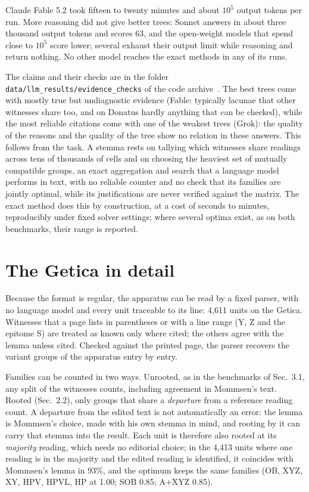 \documentclass[11pt,a4paper]{article}
\theoremstyle{remark}
\begin{document}
Claude Fable 5.2 took fifteen to twenty minutes and about $10^5$ output tokens per run. More reasoning did not give better trees: Sonnet answers in about three thousand output tokens and scores 63, and the open-weight models that spend close to $10^5$ score lower; several exhaust their output limit while reasoning and return nothing. No other model reaches the exact methods in any of its runs.

The claims and their checks are in the folder \texttt{data/llm\_results/evidence\_checks} of the code archive~\citep{StemmaMWIS}. The best trees come with mostly true but undiagnostic evidence (Fable: typically lacunae that other witnesses share too, and on Donatus hardly anything that can be checked), while the most reliable citations come with one of the weakest trees (Grok): the quality of the reasons and the quality of the tree show no relation in these answers. This follows from the task. A stemma rests on tallying which witnesses share readings across tens of thousands of cells and on choosing the heaviest set of mutually compatible groups, an exact aggregation and search that a language model performs in text, with no reliable counter and no check that its families are jointly optimal, while its justifications are never verified against the matrix. The exact method does this by construction, at a cost of seconds to minutes, reproducibly under fixed solver settings; where several optima exist, as on both benchmarks, their range is reported.

\section{The Getica in detail}
\label{app:getica}
Because the format is regular, the apparatus can be read by a fixed parser, with no language model and every unit traceable to its line: 4{,}611 units on the Getica. Witnesses that a page lists in parentheses or with a line range (Y, Z and the epitome S) are treated as known only where cited; the others agree with the lemma unless cited. Checked against the printed page, the parser recovers the variant groups of the apparatus entry by entry.

Families can be counted in two ways. Unrooted, as in the benchmarks of Sec.~3.1, any split of the witnesses counts, including agreement in Mommsen's text. Rooted (Sec.~2.2), only groups that share a \emph{departure} from a reference reading count. A departure from the edited text is not automatically an error: the lemma is Mommsen's choice, made with his own stemma in mind, and rooting by it can carry that stemma into the result. Each unit is therefore also rooted at its \emph{majority} reading, which needs no editorial choice; in the 4{,}413 units where one reading is in the majority and the edited reading is identified, it coincides with Mommsen's lemma in 93\%, and the optimum keeps the same families (OB, XYZ, XY, HPV, HPVL, HP at 1.00; SOB 0.85; A+XYZ 0.85).
\end{document}
